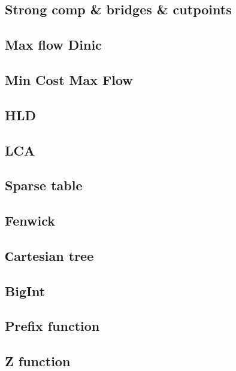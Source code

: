 \documentclass{article}
\begin{document}
\begin{multicols}{2}
\subsection{Strong comp \& bridges \& cutpoints}

\subsection{Max flow Dinic}

\subsection{Min Cost Max Flow}

\subsection{HLD}

\subsection{LCA}

\subsection{Sparse table}

\subsection{Fenwick}

\subsection{Сartesian tree}

\subsection{BigInt}

\subsection{Prefix function}

\subsection{Z function}


\end{multicols}
\end{document}
